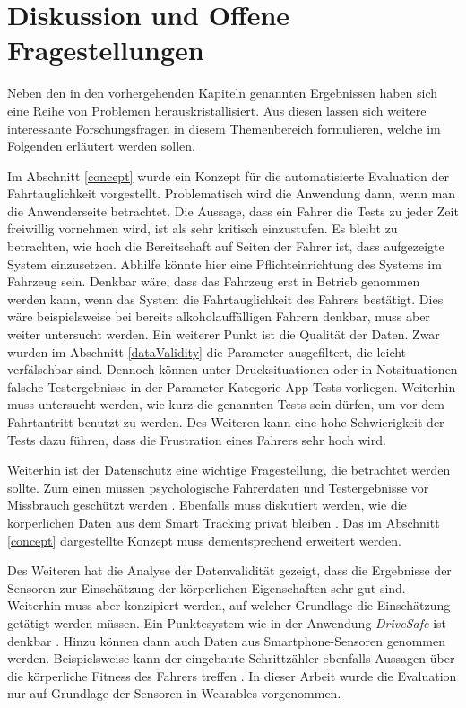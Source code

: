 \section{Diskussion und Offene Fragestellungen}
\label{openChallenges}

Neben den in den vorhergehenden Kapiteln genannten Ergebnissen haben sich eine Reihe von Problemen herauskristallisiert. Aus diesen lassen sich weitere interessante Forschungsfragen in diesem Themenbereich formulieren, welche im Folgenden erläutert werden sollen.

Im Abschnitt \ref{concept} wurde ein Konzept für die automatisierte Evaluation der Fahrtauglichkeit vorgestellt. Problematisch wird die Anwendung dann, wenn man die Anwenderseite betrachtet. Die Aussage, dass ein Fahrer die Tests zu jeder Zeit freiwillig vornehmen wird, ist als sehr kritisch einzustufen. Es bleibt zu betrachten, wie hoch die Bereitschaft auf Seiten der Fahrer ist, dass aufgezeigte System einzusetzen. Abhilfe könnte hier eine Pflichteinrichtung des Systems im Fahrzeug sein. Denkbar wäre, dass das Fahrzeug erst in Betrieb genommen werden kann, wenn das System die Fahrtauglichkeit des Fahrers bestätigt. Dies wäre beispielsweise bei bereits alkoholauffälligen Fahrern denkbar, muss aber weiter untersucht werden. Ein weiterer Punkt ist die Qualität der Daten. Zwar wurden im Abschnitt \ref{dataValidity} die Parameter ausgefiltert, die leicht verfälschbar sind. Dennoch können unter Drucksituationen oder in Notsituationen falsche Testergebnisse in der Parameter-Kategorie App-Tests vorliegen. Weiterhin muss untersucht werden, wie kurz die genannten Tests sein dürfen, um vor dem Fahrtantritt benutzt zu werden. Des Weiteren kann eine hohe Schwierigkeit der Tests dazu führen, dass die Frustration eines Fahrers sehr hoch wird. 

Weiterhin ist der Datenschutz eine wichtige Fragestellung, die betrachtet werden sollte. Zum einen müssen psychologische Fahrerdaten und Testergebnisse vor Missbrauch geschützt werden \cite{beurteilungskriterienleipzig}. Ebenfalls muss diskutiert werden, wie die körperlichen Daten aus dem Smart Tracking privat bleiben \cite{securityprivacyfitnesstracking}. Das im Abschnitt \ref{concept} dargestellte Konzept muss dementsprechend erweitert werden.

Des Weiteren hat die Analyse der Datenvalidität gezeigt, dass die Ergebnisse der Sensoren zur Einschätzung der körperlichen Eigenschaften sehr gut sind. Weiterhin muss aber konzipiert werden, auf welcher Grundlage die Einschätzung getätigt werden müssen. Ein Punktesystem wie in der Anwendung \textit{DriveSafe} ist denkbar \cite{drivesafe}. Hinzu können dann auch Daten aus Smartphone-Sensoren genommen werden. Beispielsweise kann der eingebaute Schrittzähler ebenfalls Aussagen über die körperliche Fitness des Fahrers treffen \cite{validationphysicalactivitytracking,bewegungserkennungsensoren}. In dieser Arbeit wurde die Evaluation nur auf Grundlage der Sensoren in Wearables vorgenommen.

